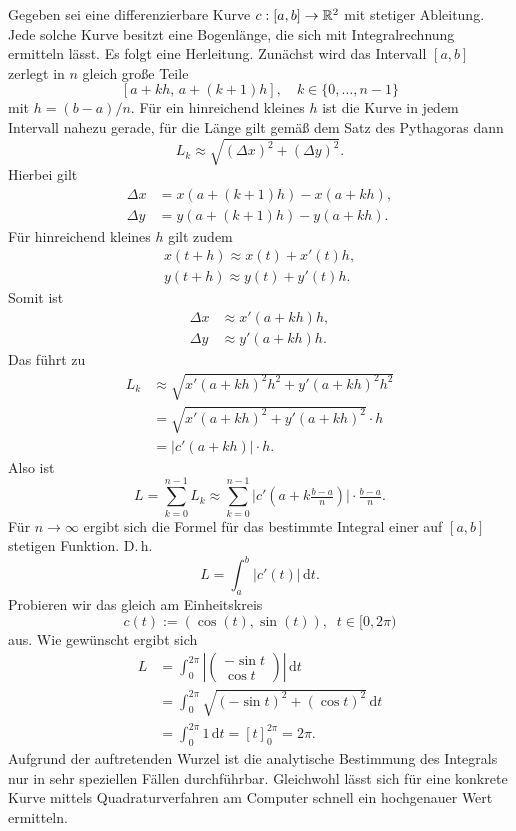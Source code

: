 Gegeben sei eine differenzierbare Kurve $c: [a,b]\to\mathbb R^2$ mit
stetiger Ableitung. Jede solche Kurve besitzt eine Bogenlänge, die sich
mit Integralrechnung ermitteln lässt. Es folgt eine Herleitung.
Zunächst wird das Intervall $[a,b]$ zerlegt in $n$ gleich große Teile
\[[a+kh,\,a+(k{+}1)h],\quad k\in\{0,\ldots,n-1\}\]
mit $h=(b-a)/n$. Für ein hinreichend kleines $h$ ist die Kurve in
jedem Intervall nahezu gerade, für die Länge gilt gemäß dem Satz des
Pythagoras dann
\[L_k \approx \sqrt{(\Delta x)^2+(\Delta y)^2}.\]
Hierbei gilt
\begin{align*}
\Delta x &= x(a+(k{+}1)h)-x(a+kh),\\
\Delta y &= y(a+(k{+}1)h)-y(a+kh).
\end{align*}
Für hinreichend kleines $h$ gilt zudem
\begin{align*}
x(t+h) \approx x(t)+x'(t)h,\\
y(t+h) \approx y(t)+y'(t)h.
\end{align*}
Somit ist
\begin{align*}
\Delta x &\approx x'(a+kh)h,\\
\Delta y &\approx y'(a+kh)h.
\end{align*}
Das führt zu
\begin{align*}
L_k &\approx \sqrt{x'(a+kh)^2 h^2+y'(a+kh)^2 h^2}\\
&= \sqrt{x'(a+kh)^2+y'(a+kh)^2}\cdot h\\
&= |c'(a+kh)|\cdot h.
\end{align*}
Also ist
\[L = \sum_{k=0}^{n-1} L_k
\approx \sum_{k=0}^{n-1} \big|c'(a+k\tfrac{b-a}{n})\big|\cdot\tfrac{b-a}{n}.\]
Für $n\to\infty$ ergibt sich die Formel für das bestimmte
Integral einer auf $[a,b]$ stetigen Funktion. D.\,h.%
\[L = \int_a^b |c'(t)|\,\mathrm dt.\]
Probieren wir das gleich am Einheitskreis
\[c(t):=(\cos(t),\sin(t)),\;\;t\in{[0,2\pi)}\]
aus. Wie gewünscht ergibt sich
\begin{align*}
L &= \int_0^{2\pi} \left|\begin{pmatrix}-\sin t\\ \cos t\end{pmatrix}\right|\,\mathrm dt\\
&= \int_0^{2\pi} \sqrt{(-\sin t)^2+(\cos t)^2}\,\mathrm dt\\
&= \int_0^{2\pi} 1\,\mathrm dt = [t]_{0}^{2\pi} = 2\pi.
\end{align*}
Aufgrund der auftretenden Wurzel ist die analytische Bestimmung
des Integrals nur in sehr speziellen Fällen durchführbar.
Gleichwohl lässt sich für eine konkrete Kurve mittels
Quadraturverfahren am Computer schnell ein hochgenauer Wert ermitteln.


